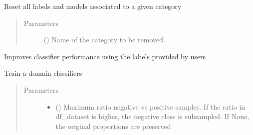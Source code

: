 \documentclass[letterpaper,10pt,english]{sphinxmanual}
\begin{document}
\begin{fulllineitems}
\begin{fulllineitems}
\end{fulllineitems}


\begin{fulllineitems}
\label{\detokenize{dc_task_manager:src.task_manager.TaskManager.reset_labels}}
\sphinxAtStartPar
Reset all labels and models associated to a given category
\begin{quote}\begin{description}
\item[{Parameters}] \leavevmode
\sphinxAtStartPar
{} () \textendash{} Name of the category to be removed.

\end{description}\end{quote}

\end{fulllineitems}


\begin{fulllineitems}
\label{\detokenize{dc_task_manager:src.task_manager.TaskManager.retrain_model}}
\sphinxAtStartPar
Improves classifier performance using the labels provided by users

\end{fulllineitems}


\begin{fulllineitems}
\label{\detokenize{dc_task_manager:src.task_manager.TaskManager.train_PUmodel}}
\sphinxAtStartPar
Train a domain classifiers
\begin{quote}\begin{description}
\item[{Parameters}] \leavevmode\begin{itemize}
\item {} 
\sphinxAtStartPar
{} () \textendash{} Maximum ratio negative vs positive samples. If the ratio in
df\_dataset is higher, the negative class is subsampled.
If None, the original proportions are preserved


\end{itemize}
\end{description}
\end{quote}
\end{fulllineitems}
\end{fulllineitems}
\end{document}
